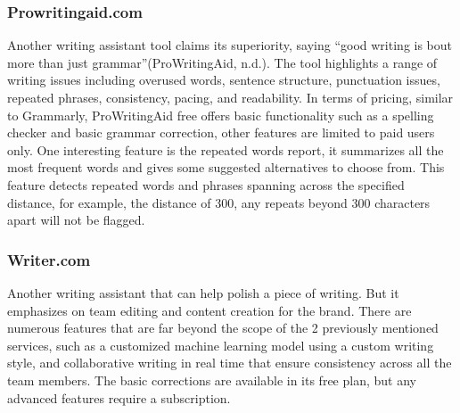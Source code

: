 \documentclass[12pt,oneside,openright,a4paper]{cpe-english-project}
\begin{document}
\subsubsection{Prowritingaid.com} Another writing assistant tool claims its superiority, saying “good writing is bout more than just grammar”(ProWritingAid, n.d.). The tool highlights a range of writing issues including overused words, sentence structure, punctuation issues, repeated phrases, consistency, pacing, and readability. In terms of pricing, similar to Grammarly, ProWritingAid free offers basic functionality such as a spelling checker and basic grammar correction, other features are limited to paid users only. One interesting feature is the repeated words report, it summarizes all the most frequent words and gives some suggested alternatives to choose from. This feature detects repeated words and phrases spanning across the specified distance, for example, the distance of 300, any repeats beyond 300 characters apart will not be flagged\cite{g}. 

\subsubsection{Writer.com} Another writing assistant that can help polish a piece of writing. But it emphasizes on team editing and content creation for the brand. There are numerous features that are far beyond the scope of the 2 previously mentioned services, such as a customized machine learning model using a custom writing style, and collaborative writing in real time that ensure consistency across all the team members. The basic corrections are available in its free plan, but any advanced features require a subscription\cite{i}.
\end{document}
